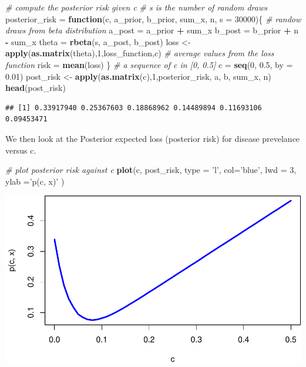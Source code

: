 \documentclass[
]{article}
\newenvironment{Shaded}{\begin{snugshade}}{\end{snugshade}}
\newcommand{\CommentTok}[1]{\textcolor[rgb]{0.56,0.35,0.01}{\textit{#1}}}
\newcommand{\ControlFlowTok}[1]{\textcolor[rgb]{0.13,0.29,0.53}{\textbf{#1}}}
\newcommand{\DataTypeTok}[1]{\textcolor[rgb]{0.13,0.29,0.53}{#1}}
\newcommand{\DecValTok}[1]{\textcolor[rgb]{0.00,0.00,0.81}{#1}}
\newcommand{\FloatTok}[1]{\textcolor[rgb]{0.00,0.00,0.81}{#1}}
\newcommand{\KeywordTok}[1]{\textcolor[rgb]{0.13,0.29,0.53}{\textbf{#1}}}
\newcommand{\NormalTok}[1]{#1}
\newcommand{\OperatorTok}[1]{\textcolor[rgb]{0.81,0.36,0.00}{\textbf{#1}}}
\newcommand{\StringTok}[1]{\textcolor[rgb]{0.31,0.60,0.02}{#1}}
\begin{document}
\begin{Shaded}
\begin{Highlighting}[]
\CommentTok{# compute the posterior risk given c }
\CommentTok{# s is the number of random draws }
\NormalTok{posterior_risk =}\StringTok{ }\ControlFlowTok{function}\NormalTok{(c, a_prior, b_prior, sum_x, n, }\DataTypeTok{s =} \DecValTok{30000}\NormalTok{)\{}
  \CommentTok{# randow draws from beta distribution }
\NormalTok{  a_post =}\StringTok{ }\NormalTok{a_prior }\OperatorTok{+}\StringTok{ }\NormalTok{sum_x}
\NormalTok{  b_post =}\StringTok{ }\NormalTok{b_prior }\OperatorTok{+}\StringTok{ }\NormalTok{n }\OperatorTok{-}\StringTok{ }\NormalTok{sum_x}
\NormalTok{  theta =}\StringTok{ }\KeywordTok{rbeta}\NormalTok{(s, a_post, b_post)}
\NormalTok{  loss <-}\StringTok{ }\KeywordTok{apply}\NormalTok{(}\KeywordTok{as.matrix}\NormalTok{(theta),}\DecValTok{1}\NormalTok{,loss_function,c)}
  \CommentTok{# average values from the loss function}
\NormalTok{  risk =}\StringTok{ }\KeywordTok{mean}\NormalTok{(loss)}
\NormalTok{\}}
\CommentTok{# a sequence of c in [0, 0.5]}
\NormalTok{c =}\StringTok{ }\KeywordTok{seq}\NormalTok{(}\DecValTok{0}\NormalTok{, }\FloatTok{0.5}\NormalTok{, }\DataTypeTok{by =} \FloatTok{0.01}\NormalTok{)}
\NormalTok{post_risk <-}\StringTok{ }\KeywordTok{apply}\NormalTok{(}\KeywordTok{as.matrix}\NormalTok{(c),}\DecValTok{1}\NormalTok{,posterior_risk, a, b, sum_x, n)}
\KeywordTok{head}\NormalTok{(post_risk)}
\end{Highlighting}
\end{Shaded}

\begin{verbatim}
## [1] 0.33917940 0.25367603 0.18868962 0.14489894 0.11693106 0.09453471
\end{verbatim}

We then look at the Posterior expected loss (posterior risk) for disease
prevelance versus c.~

\begin{Shaded}
\begin{Highlighting}[]
\CommentTok{# plot posterior risk against c }
\KeywordTok{plot}\NormalTok{(c, post_risk, }\DataTypeTok{type =} \StringTok{'l'}\NormalTok{, }\DataTypeTok{col=}\StringTok{'blue'}\NormalTok{, }
    \DataTypeTok{lwd =} \DecValTok{3}\NormalTok{, }\DataTypeTok{ylab =}\StringTok{'p(c, x)'}\NormalTok{ )}
\end{Highlighting}
\end{Shaded}

\includegraphics{lab-03_files/figure-latex/unnamed-chunk-4-1.pdf}
\end{document}
